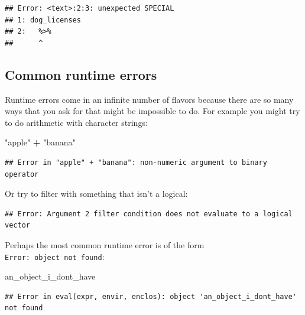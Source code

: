 \documentclass[]{Nemilov}
\newenvironment{Shaded}{\begin{snugshade}}{\end{snugshade}}
\newcommand{\KeywordTok}[1]{\textcolor[rgb]{0.13,0.29,0.53}{\textbf{#1}}}
\newcommand{\NormalTok}[1]{#1}
\newcommand{\OperatorTok}[1]{\textcolor[rgb]{0.81,0.36,0.00}{\textbf{#1}}}
\newcommand{\StringTok}[1]{\textcolor[rgb]{0.31,0.60,0.02}{#1}}
\begin{document}
\begin{itemize}
\begin{verbatim}
## Error: <text>:2:3: unexpected SPECIAL
## 1: dog_licenses
## 2:   %>%
##      ^
\end{verbatim}
\end{itemize}

\hypertarget{common-runtime-errors}{%
\subsection{Common runtime errors}\label{common-runtime-errors}}

Runtime errors come in an infinite number of flavors because there are so many ways that you ask for that might be impossible to do. For example you might try to do arithmetic with character strings:

\begin{Shaded}
\begin{Highlighting}[]
\StringTok{"apple"} \OperatorTok{+}\StringTok{ "banana"}
\end{Highlighting}
\end{Shaded}

\begin{verbatim}
## Error in "apple" + "banana": non-numeric argument to binary operator
\end{verbatim}

Or try to filter with something that isn't a logical:

\begin{Shaded}
\end{Shaded}

\begin{verbatim}
## Error: Argument 2 filter condition does not evaluate to a logical vector
\end{verbatim}

Perhaps the most common runtime error is of the form \texttt{Error:\ object\ not\ found}:

\begin{Shaded}
\begin{Highlighting}[]
\NormalTok{an_object_i_dont_have}
\end{Highlighting}
\end{Shaded}

\begin{verbatim}
## Error in eval(expr, envir, enclos): object 'an_object_i_dont_have' not found
\end{verbatim}
\end{document}
